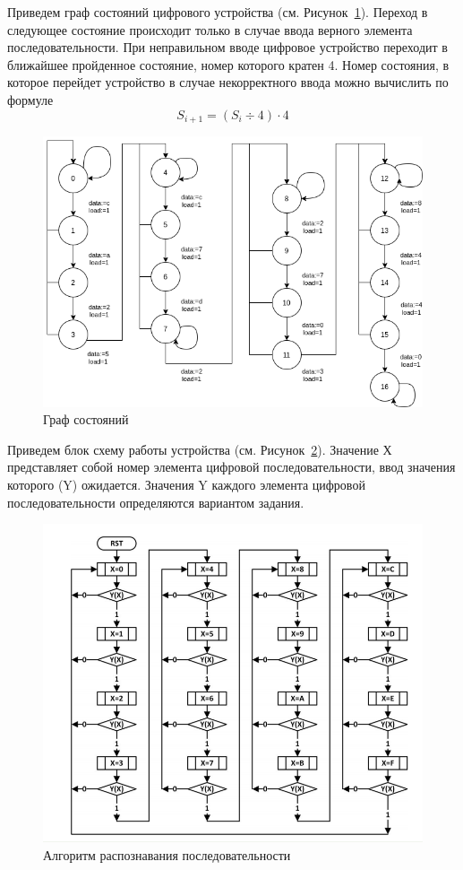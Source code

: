 \documentclass[a4paper,14pt]{extarticle}
\begin{document}
Приведем граф состояний цифрового устройства (см. Рисунок~\ref{fig:state-graph-pract3}). Переход в следующее состояние происходит только в случае ввода верного элемента последовательности. При неправильном вводе цифровое устройство переходит в ближайшее пройденное состояние, номер которого кратен 4. Номер состояния, в которое перейдет устройство в случае некорректного ввода можно вычислить по формуле 
\[S_{i+1}=(S_i \div 4) \cdot 4\]

\begin{figure}[h!]
	\centering
	\includegraphics[width=0.7\linewidth]{images/state-graph-pract3}
	\caption{Граф состояний}
	\label{fig:state-graph-pract3}
\end{figure}

\newpage
Приведем блок схему работы устройства (см. Рисунок~\ref{fig:algorithm-pract3}). Значение Х представляет
собой номер элемента цифровой последовательности, ввод значения которого (Y)
ожидается. Значения Y каждого элемента цифровой последовательности определяются
вариантом задания.

\begin{figure}[h!]
	\centering
	\includegraphics[width=0.68\linewidth]{images/algorithm-pract3}
	\caption{Алгоритм распознавания последовательности}
	\label{fig:algorithm-pract3}
\end{figure}
\end{document}
